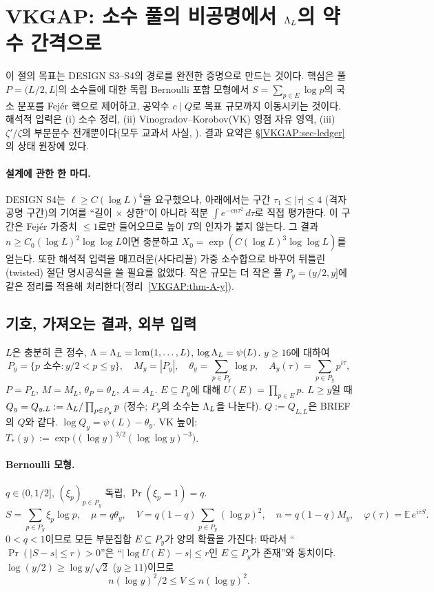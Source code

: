 \section{VKGAP: 소수 풀의 비공명에서 $\Lambda_L$의 약수 간격으로}
\label{VKGAP:sec}

이 절의 목표는 DESIGN S3--S4의 경로를 완전한 증명으로 만드는 것이다.
핵심은 풀 $P=(L/2,L]$의 소수들에 대한 독립 Bernoulli 포함 모형에서 $S=\sum_{p\in E}\log p$의
국소 분포를 Fejér 핵으로 제어하고, 공약수 $c\mid Q$로 목표 규모까지 이동시키는 것이다.
해석적 입력은 (i) 소수 정리, (ii) Vinogradov--Korobov(VK) 영점 자유 영역, (iii) $\zeta'/\zeta$의
부분분수 전개뿐이다(모두 교과서 사실, \EXT).
결과 요약은 \S\ref{VKGAP:sec-ledger}의 상태 원장에 있다.

\paragraph{설계에 관한 한 마디.}
DESIGN S4는 $\ell\ge C(\log L)^4$을 요구했으나, 아래에서는 구간 $\tau_1\le|\tau|\le 4$ (격자 공명 구간)의
기여를 ``길이 $\times$ 상한''이 아니라 적분 $\int e^{-c n\tau^2}\,d\tau$로 직접 평가한다.
이 구간은 Fejér 가중치 $\le 1$로만 들어오므로 높이 $T$의 인자가 붙지 않는다. 그 결과
$n\ge C_0(\log L)^2\log\log L$이면 충분하고 $X_0=\exp(C(\log L)^3\log\log L)$를 얻는다.
또한 해석적 입력을 매끄러운(사다리꼴) 가중 소수합으로 바꾸어 뒤틀린(twisted) 절단 명시공식을
쓸 필요를 없앴다. 작은 규모는 더 작은 풀 $P_y=(y/2,y]$에 같은 정리를 적용해 처리한다(정리~\ref{VKGAP:thm-A-y}).

\subsection{기호, 가져오는 결과, 외부 입력}
\label{VKGAP:sec-setup}

$L$은 충분히 큰 정수, $\Lambda=\Lambda_L=\operatorname{lcm}(1,\dots,L)$, $\log\Lambda_L=\psi(L)$.
$y\ge 16$에 대하여
\[
P_y=\{p \text{ 소수}: y/2<p\le y\},\quad M_y=|P_y|,\quad \theta_y=\sum_{p\in P_y}\log p,\quad
A_y(\tau)=\sum_{p\in P_y}p^{i\tau},
\]
$P=P_L$, $M=M_L$, $\theta_P=\theta_L$, $A=A_L$. $E\subseteq P_y$에 대해 $U(E)=\prod_{p\in E}p$.
$L\ge y$일 때 $Q_y=Q_{y,L}:=\Lambda_L/\prod_{p\in P_y}p$ (정수; $P_y$의 소수는 $\Lambda_L$을 나눈다).
$Q:=Q_{L,L}$은 BRIEF의 $Q$와 같다. $\log Q_y=\psi(L)-\theta_y$.
VK 높이: $T_*(y):=\exp\!\big((\log y)^{3/2}(\log\log y)^{-3}\big)$.

\paragraph{Bernoulli 모형.} $q\in(0,1/2]$, $(\xi_p)_{p\in P_y}$ 독립, $\Pr(\xi_p=1)=q$.
\[
S=\sum_{p\in P_y}\xi_p\log p,\quad \mu=q\theta_y,\quad V=q(1-q)\sum_{p\in P_y}(\log p)^2,\quad
n=q(1-q)M_y,\quad \varphi(\tau)=\mathbb{E}\,e^{i\tau S}.
\]
$0<q<1$이므로 모든 부분집합 $E\subseteq P_y$가 양의 확률을 가진다: 따라서
``$\Pr(|S-s|\le r)>0$''은 ``$|\log U(E)-s|\le r$인 $E\subseteq P_y$가 존재''와 동치이다.
$\log(y/2)\ge \log y/\sqrt2$ ($y\ge 11$)이므로
\begin{equation}\label{VKGAP:eq-V}
n(\log y)^2/2\le V\le n(\log y)^2 .
\end{equation}

